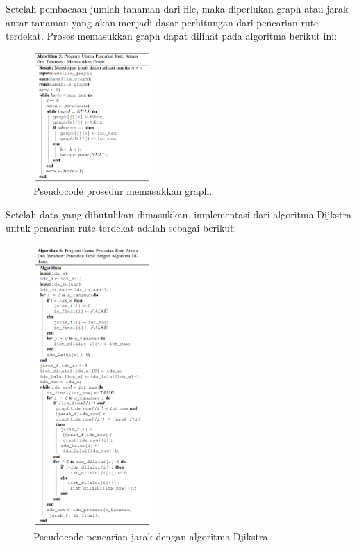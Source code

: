 \documentclass[conference]{IEEEtran}
\begin{document}
    Setelah pembacaan jumlah tanaman dari file, maka diperlukan graph atau jarak antar tanaman yang akan menjadi dasar
    perhitungan dari pencarian rute terdekat. Proses memasukkan
    graph dapat dilihat pada algoritma berikut ini:

    \begin{figure}[H]
        \centerline{\includegraphics[width=0.4\textwidth]{./sources/masukkanGraph.png}}
        \caption{Pseudocode prosedur memasukkan graph.}
        \label{fig6}
    \end{figure}  

    Setelah data yang dibutuhkan dimasukkan, implementasi
    dari algoritma Dijkstra untuk pencarian rute terdekat adalah
    sebagai berikut:
    
    \begin{figure}[H]
        \centerline{\includegraphics[width=0.4\textwidth]{./sources/cariJarak.png}}
        \caption{Pseudocode pencarian jarak dengan algoritma Djikstra.}
        \label{fig7}
    \end{figure} 
\end{document}
